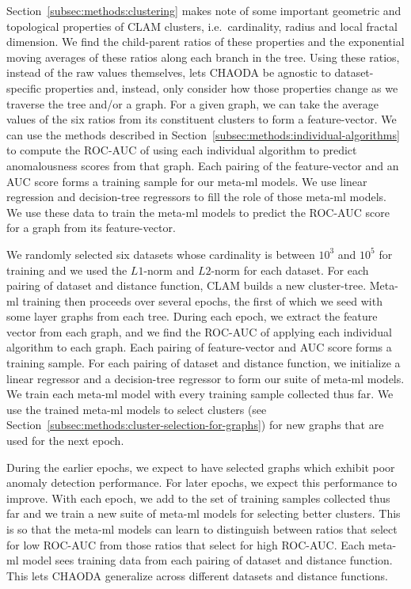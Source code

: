 Section~\ref{subsec:methods:clustering} makes note of some important geometric and topological properties of CLAM clusters, i.e.\ cardinality, radius and local fractal dimension.
We find the child-parent ratios of these properties and the exponential moving averages of these ratios along each branch in the tree.
Using these ratios, instead of the raw values themselves, lets CHAODA be agnostic to dataset-specific properties and, instead, only consider how those properties change as we traverse the tree and/or a graph.
For a given graph, we can take the average values of the six ratios from its constituent clusters to form a feature-vector.
We can use the methods described in Section~\ref{subsec:methods:individual-algorithms} to compute the ROC-AUC of using each individual algorithm to predict anomalousness scores from that graph.
Each pairing of the feature-vector and an AUC score forms a training sample for our meta-ml models.
We use linear regression and decision-tree regressors to fill the role of those meta-ml models.
We use these data to train the meta-ml models to predict the ROC-AUC score for a graph from its feature-vector.

We randomly selected six datasets whose cardinality is between $10^3$ and $10^5$ for training and we used the $L1$-norm and $L2$-norm for each dataset.
For each pairing of dataset and distance function, CLAM builds a new cluster-tree.
Meta-ml training then proceeds over several epochs, the first of which we seed with some layer graphs from each tree.
During each epoch, we extract the feature vector from each graph, and we find the ROC-AUC of applying each individual algorithm to each graph.
Each pairing of feature-vector and AUC score forms a training sample.
For each pairing of dataset and distance function, we initialize a linear regressor and a decision-tree regressor to form our suite of meta-ml models.
We train each meta-ml model with every training sample collected thus far.
We use the trained meta-ml models to select clusters (see Section~\ref{subsec:methods:cluster-selection-for-graphs}) for new graphs that are used for the next epoch.

During the earlier epochs, we expect to have selected graphs which exhibit poor anomaly detection performance.
For later epochs, we expect this performance to improve.
With each epoch, we add to the set of training samples collected thus far and we train a new suite of meta-ml models for selecting better clusters.
This is so that the meta-ml models can learn to distinguish between ratios that select for low ROC-AUC from those ratios that select for high ROC-AUC.
Each meta-ml model sees training data from each pairing of dataset and distance function.
This lets CHAODA generalize across different datasets and distance functions.


